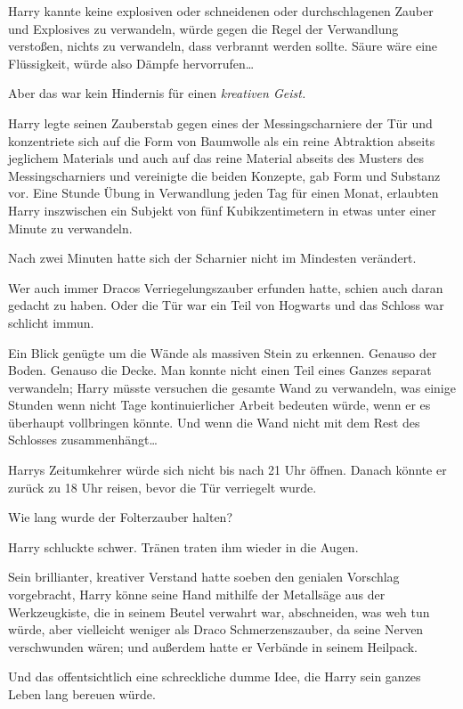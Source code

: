 {Harry kannte keine explosiven oder schneidenen oder durchschlagenen Zauber und Explosives zu verwandeln, würde gegen die Regel der Verwandlung verstoßen, nichts zu verwandeln, dass verbrannt werden sollte. Säure wäre eine Flüssigkeit, würde also Dämpfe hervorrufen…

Aber das war kein Hindernis für einen \emph{kreativen Geist.}

Harry legte seinen Zauberstab gegen eines der Messingscharniere der Tür und konzentriete sich auf die Form von Baumwolle als ein reine Abtraktion abseits jeglichem Materials und auch auf das reine Material abseits des Musters des Messingscharniers und vereinigte die beiden Konzepte, gab Form und Substanz vor. Eine Stunde Übung in Verwandlung jeden Tag für einen Monat, erlaubten Harry inszwischen ein Subjekt von fünf Kubikzentimetern in etwas unter einer Minute zu verwandeln.

Nach zwei Minuten hatte sich der Scharnier nicht im Mindesten verändert.

Wer auch immer Dracos Verriegelungszauber erfunden hatte, schien auch daran gedacht zu haben. Oder die Tür war ein Teil von Hogwarts und das Schloss war schlicht immun.

Ein Blick genügte um die Wände als massiven Stein zu erkennen. Genauso der Boden. Genauso die Decke. Man konnte nicht einen Teil eines Ganzes separat verwandeln; Harry müsste versuchen die gesamte Wand zu verwandeln, was einige Stunden wenn nicht Tage kontinuierlicher Arbeit bedeuten würde, wenn er es überhaupt vollbringen könnte. Und wenn die Wand nicht mit dem Rest des Schlosses zusammenhängt…

Harrys Zeitumkehrer würde sich nicht bis nach 21 Uhr öffnen. Danach könnte er zurück zu 18 Uhr reisen, bevor die Tür verriegelt wurde.

Wie lang wurde der Folterzauber halten?

Harry schluckte schwer. Tränen traten ihm wieder in die Augen.

Sein brillianter, kreativer Verstand hatte soeben den genialen Vorschlag vorgebracht, Harry könne seine Hand mithilfe der Metallsäge aus der Werkzeugkiste, die in seinem Beutel verwahrt war, abschneiden, was weh tun würde, aber vielleicht weniger als Draco Schmerzenszauber, da seine Nerven verschwunden wären; und außerdem hatte er Verbände in seinem Heilpack.

Und das offentsichtlich eine schreckliche dumme Idee, die Harry sein ganzes Leben lang bereuen würde.

}

